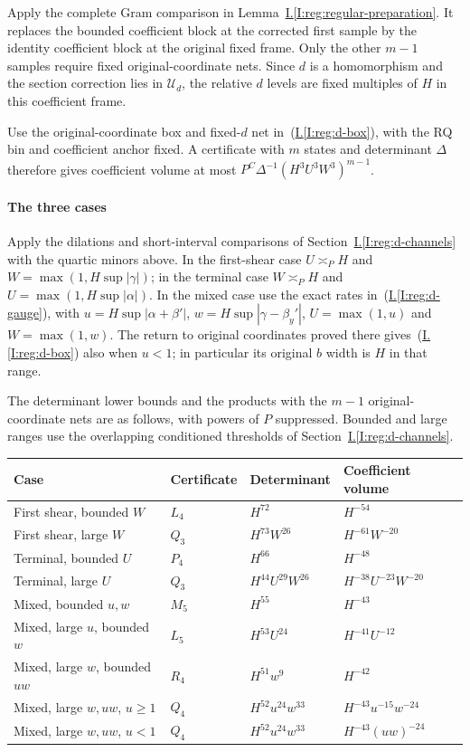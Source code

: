\documentclass[11pt]{amsart}
\theoremstyle{definition}
\theoremstyle{remark}
\numberwithin{equation}{section}
\newcommand{\partIref}[1]{\hyperref[I:#1]{I.\ref*{I:#1}}}
\newcommand{\partIeqref}[1]{\textup{(\partIref{#1})}}
\begin{document}
Apply the complete Gram comparison in Lemma~\partIref{reg:regular-preparation}. It replaces the bounded coefficient block at the corrected first sample by the identity coefficient block at the original fixed frame. Only the other $m-1$ samples require fixed original-coordinate nets. Since $d$ is a homomorphism and the section correction lies in $\mathcal U_d$, the relative $d$ levels are fixed multiples of $H$ in this coefficient frame.

Use the original-coordinate box and fixed-$d$ net in~\partIeqref{reg:d-box}, with the RQ bin and coefficient anchor fixed. A certificate with $m$ states and determinant $\Delta$ therefore gives coefficient volume at most $P^C\Delta^{-1}(H^3U^3W^3)^{m-1}$.

\paragraph{The three cases}

Apply the dilations and short-interval comparisons of Section~\partIref{reg:d-channels} with the quartic minors above. In the first-shear case $U\asymp_PH$ and $W=\max(1,H\sup|\gamma|)$; in the terminal case $W\asymp_PH$ and $U=\max(1,H\sup|\alpha|)$. In the mixed case use the exact rates in~\partIeqref{reg:d-gauge}, with $u=H\sup|\alpha+\beta'|$, $w=H\sup|\gamma-\beta_y'|$, $U=\max(1,u)$ and $W=\max(1,w)$. The return to original coordinates proved there gives~\partIeqref{reg:d-box} also when $u<1$; in particular its original $b$ width is $H$ in that range.

The determinant lower bounds and the products with the $m-1$ original-coordinate nets are as follows, with powers of $P$ suppressed. Bounded and large ranges use the overlapping conditioned thresholds of Section~\partIref{reg:d-channels}.
\begin{center}\small
\begin{tabular}{llll}
\toprule
Case & Certificate & Determinant & Coefficient volume\\
\midrule
First shear, bounded $W$ & $L_4$ & $H^{72}$ & $H^{-54}$\\
First shear, large $W$ & $Q_3$ & $H^{73}W^{26}$ & $H^{-61}W^{-20}$\\
Terminal, bounded $U$ & $P_4$ & $H^{66}$ & $H^{-48}$\\
Terminal, large $U$ & $Q_3$ & $H^{44}U^{29}W^{26}$ & $H^{-38}U^{-23}W^{-20}$\\
Mixed, bounded $u,w$ & $M_5$ & $H^{55}$ & $H^{-43}$\\
Mixed, large $u$, bounded $w$ & $L_5$ & $H^{53}U^{24}$ & $H^{-41}U^{-12}$\\
Mixed, large $w$, bounded $uw$ & $R_4$ & $H^{51}w^9$ & $H^{-42}$\\
Mixed, large $w,uw$, $u\ge1$ & $Q_4$ & $H^{52}u^{24}w^{33}$ & $H^{-43}u^{-15}w^{-24}$\\
Mixed, large $w,uw$, $u<1$ & $Q_4$ & $H^{52}u^{24}w^{33}$ & $H^{-43}(uw)^{-24}$\\
\bottomrule
\end{tabular}
\end{center}
\end{document}
